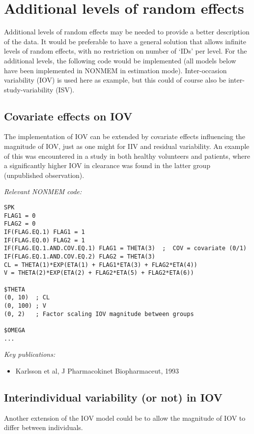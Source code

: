 \documentclass[a4paper,11pt]{article}
\begin{document}
\section{Additional levels of random effects}
Additional levels of random effects may be needed to provide a better
description of the data. It would be preferable to have a general
solution that allows infinite levels of random effects, with no
restriction on number of `IDs' per level. For the additional levels,
the following code would be implemented (all models below have been
implemented in NONMEM in estimation mode). Inter-occasion variability
(IOV) is used here as example, but this could of course also be
inter-study-variability (ISV).

\subsection{Covariate effects on IOV}
The implementation of IOV can be extended by covariate effects
influencing the magnitude of IOV, just as one might for IIV and
residual variability. An example of this was encountered in a study in
both healthy volunteers and patients, where a significantly higher IOV
in clearance was found in the latter group (unpublished observation).

\vspace{10pt}

\noindent \emph{Relevant NONMEM code:}
\begin{lstlisting}
SPK
FLAG1 = 0
FLAG2 = 0
IF(FLAG.EQ.1) FLAG1 = 1
IF(FLAG.EQ.0) FLAG2 = 1
IF(FLAG.EQ.1.AND.COV.EQ.1) FLAG1 = THETA(3)  ;  COV = covariate (0/1)
IF(FLAG.EQ.1.AND.COV.EQ.2) FLAG2 = THETA(3) 
CL = THETA(1)*EXP(ETA(1) + FLAG1*ETA(3) + FLAG2*ETA(4))
V = THETA(2)*EXP(ETA(2) + FLAG2*ETA(5) + FLAG2*ETA(6))

$THETA
(0, 10)  ; CL
(0, 100) ; V
(0, 2)   ; Factor scaling IOV magnitude between groups

$OMEGA 
...
\end{lstlisting}

\noindent \emph{Key publications:}
\begin{itemize}
\item Karlsson et al, J Pharmacokinet Biopharmaceut, 1993
\end{itemize}

\subsection{Interindividual variability (or not) in IOV}
Another extension of the IOV model could be to allow the magnitude of
IOV to differ between individuals.
\end{document}
